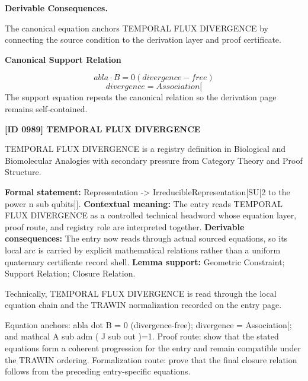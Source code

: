 \par\vspace{0.35em}
\noindent\textbf{Derivable Consequences.}\quad
\begingroup
\footnotesize
\raggedright
The canonical equation anchors TEMPORAL FLUX DIVERGENCE by connecting the source condition to the derivation layer and proof certificate.
\par\endgroup

\noindent\textbf{Canonical Support Relation}\par
\[
abla \cdot B = 0 (divergence-free)
\]
\[
divergence = Association[
\]
\noindent The support equation repeats the canonical relation so the derivation page remains self-contained.\par

\clearpage
\noindent\textbf{[ID 0989] TEMPORAL FLUX DIVERGENCE}\par
\vspace{0.35em}
\begingroup\small
{}
TEMPORAL FLUX DIVERGENCE is a registry definition in Biological and Biomolecular Analogies with secondary pressure from Category Theory and Proof Structure.

\begingroup\footnotesize\setlength{\emergencystretch}{3em}\sloppy
\textbf{Formal statement:} Representation -> IrreducibleRepresentation[SU[2 to the power n sub qubits]]. \textbf{Contextual meaning:} The entry reads TEMPORAL FLUX DIVERGENCE as a controlled technical headword whose equation layer, proof route, and registry role are interpreted together. \textbf{Derivable consequences:} The entry now reads through actual sourced equations, so its local arc is carried by explicit mathematical relations rather than a uniform quaternary certificate record shell. \textbf{Lemma support:} Geometric Constraint; Support Relation; Closure Relation.\par
\endgroup

Technically, TEMPORAL FLUX DIVERGENCE is read through the local equation chain and the TRAWIN normalization recorded on the entry page.

Equation anchors: abla dot B = 0 (divergence-free); divergence = Association[; and mathcal A sub adm ( J sub out )=1. Proof route: show that the stated equations form a coherent progression for the entry and remain compatible under the TRAWIN ordering. Formalization route: prove that the final closure relation follows from the preceding entry-specific equations.

